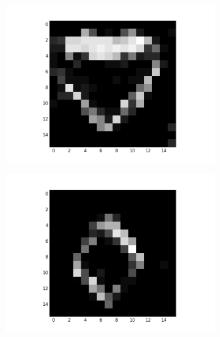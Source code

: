\begin{figure}[h!]
	\centering
	\begin{subfigure}{.25\textwidth}
  		\centering
  		\includegraphics[width=\linewidth]{imgs/poker/recon_img1.png}
  		\label{fig:sub1}
	\end{subfigure}%
	\begin{subfigure}{.25\textwidth}
  		\centering
  		\includegraphics[width=\linewidth]{imgs/poker/recon_img3.png}
  		\label{fig:sub1}
	\end{subfigure}%
	\begin{subfigure}{.25\textwidth}
  		\centering

\end{subfigure}
\end{figure}
